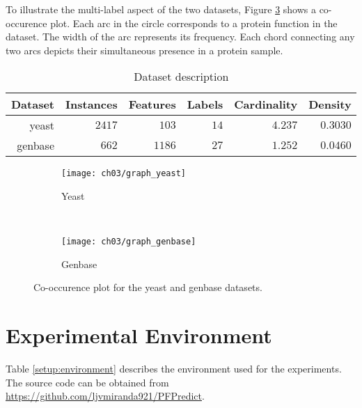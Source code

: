 \par To illustrate the multi-label aspect of the two datasets, Figure
\ref{graph:cooccurence} shows a co-occurence plot. Each arc in the circle
corresponds to a protein function in the dataset. The width of the arc
represents its frequency. Each chord connecting any two arcs depicts their
simultaneous presence in a protein sample.


\begin{table}[t]
    \centering
    \caption{Dataset description}
    \label{setup:datasets}
    \begin{tabular}{@{}rrrrrr@{}}
        \toprule
        Dataset & Instances & Features & Labels & Cardinality & Density    \\ \midrule
        yeast   & $2417$      & $103$      & $14$     & $4.237$       & $0.3030$     \\
        genbase & $662$       & $1186$     & $27$     & $1.252$       & $0.0460$     \\ \bottomrule
    \end{tabular}
\end{table}


\begin{figure}[t]
    \centering
    \begin{subfigure}[b]{0.49\textwidth}
        \texttt{[image: ch03/graph\_yeast]}
        \caption{Yeast}
        \label{graph:yeast}
    \end{subfigure}
    ~ %
    \begin{subfigure}[b]{0.49\textwidth}
        \texttt{[image: ch03/graph\_genbase]}
        \caption{Genbase}
        \label{graph:genbase}
    \end{subfigure}
    \caption{Co-occurence plot for the yeast and genbase datasets.}
    \label{graph:cooccurence}
\end{figure}

\section{Experimental Environment}
\label{ExperimentalEnvironment}

Table \ref{setup:environment} describes the environment used for the
experiments. The source code can be obtained from
\url{https://github.com/ljvmiranda921/PFPredict}.

